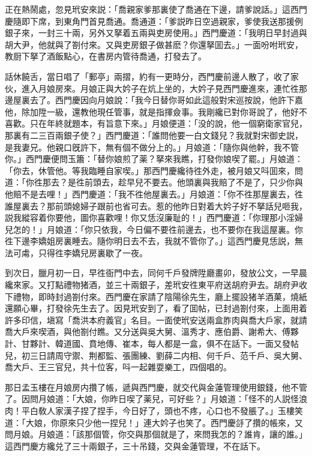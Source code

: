 正在熱鬧處，忽見玳安來説：「喬親家爹那裏使了喬通在下邊，請爹說話。」這西門慶隨即下席，到東角門首見喬通。喬通道：「爹説昨日空過親家，爹使我送那援例銀子來，一封三十兩，另外又拏着五兩與吏房使用。」西門慶道：「我明日早封過與胡大尹，他就與了劄付來。又與吏房銀子做甚麽？你還拏囬去。」一面吩咐玳安，教厨下拏了酒飯點心，在書房内管待喬通，打發去了。

話休饒舌，當日唱了「郵亭」兩摺，約有一更時分，西門慶前邊人散了，收了家伙，進入月娘房來。月娘正與大妗子在炕上坐的，大妗子見西門慶進來，連忙徃那邊屋裏去了。西門慶因向月娘說：「我今日替你哥如此這般對宋巡按說，他許下嘉他，除加陞一級，還教他現任管事，就是指揮僉事。我剛纔已對你哥說了，他好不喜歡。只在年終就題本，有旨意下來。」月娘便道：「没的說，他一個窮衛家官兒，那裏有二三百兩銀子使？」西門慶道：「誰問他要一白文錢兒？我就對宋御史説，是我妻兄。他親口旣許下，無有個不做分上的。」月娘道：「隨你與他幹，我不管你。」西門慶便問玉簫：「替你娘煎了薬？拏來我瞧，打發你娘喫了罷。」月娘道：「你去，休管他。等我臨睡自家喫。」那西門慶纔待徃外走，被月娘又呌囬來，問道：「你徃那去？是徃前頭去，趁早兒不要去。他頭裏與我賠了不是了，只少你與他賠不是去哩！」西門慶道：「我不徃他屋裏去。」月娘道：「你不徃那屋裏去，徃誰屋裏去？那前頭媳婦子跟前也省可去。惹的他昨日對着大妗子好不拏話兒咂我，説我縱容着你要他，圖你喜歡哩！你又恁沒廉耻的！」西門慶道：「你理那小淫婦兒怎的！」月娘道：「你只依我，今日偏不要徃前邊去，也不要你在我這屋裏。你徃下邊李嬌姐房裏睡去。隨你明日去不去，我就不管你了。」這西門慶見恁説，無法可䖏，只得徃李嬌兒房裏歇了一夜。

到次日，臘月初一日，早徃衙門中去，同何千戶發牌陞廳畫卯，發放公文，一早晨纔來家。又打點禮物猪酒，並三十兩銀子，差玳安徃東平府送胡府尹去。胡府尹收下禮物，即時封過劄付來。西門慶在家請了陰陽徐先生，廳上擺設猪羊酒菓，燒紙還願心畢，打發徐先生去了。因見玳安到了，看了囬帖，已封過劄付來，上面用着許多印信，塡寫「喬洪本府義官」名目。一面使玳安送兩盒胙肉與喬大戶家，就請喬大戶來喫酒，與他劄付瞧。又分送與吳大舅、溫秀才、應伯爵、謝希大、傅夥計、甘夥計、韓道國、賁地傳、崔本，每人都是一盒，俱不在話下。一面又發帖兒，初三日請周守禦、荆都監、張團練、劉薛二内相、何千戶、范千戶、吳大舅、喬大戶、王三官兒，共十位客，呌一起雜耍樂工，四個唱的。

那日孟玉樓在月娘房内攢了帳，遞與西門慶，就交代與金蓮管理使用銀錢，他不管了。因問月娘道：「大娘，你昨日喫了薬兒，可好些？」月娘道：「怪不的人説怪浪肉！平白敎人家漢子捏了捏手，今日好了，頭也不疼，心口也不發脹了。」玉樓笑道：「大娘，你原來只少他一捏兒！」連大妗子也笑了。西門慶㧱了攢的帳來，又問月娘。月娘道：「該那個管，你交與那個就是了，來問我怎的？誰肯，讓的誰。」這西門慶方纔兑了三十兩銀子，三十吊錢，交與金蓮管理，不在話下。

